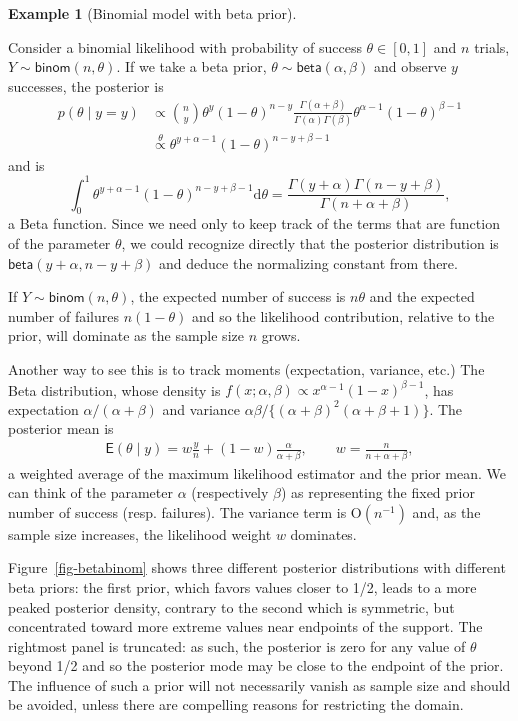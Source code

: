 \documentclass[
  11pt,
  letterpaper,
]{scrbook}
\theoremstyle{definition}
\theoremstyle{plain}
\theoremstyle{plain}
\theoremstyle{definition}
\newtheorem{example}{Example}[chapter]
\theoremstyle{definition}
\theoremstyle{remark}
\begin{document}
\begin{example}[Binomial model with beta
prior]\protect\hypertarget{exm-betabinomconjugate}{}\label{exm-betabinomconjugate}

Consider a binomial likelihood with probability of success
\(\theta \in [0,1]\) and \(n\) trials,
\(Y \sim \mathsf{binom}(n, \theta)\). If we take a beta prior,
\(\theta \sim \mathsf{beta}(\alpha, \beta)\) and observe \(y\)
successes, the posterior is \begin{align*}
p(\theta \mid y = y) &\propto \binom{n}{y} \theta^y (1-\theta)^{n-y} \frac{\Gamma(\alpha + \beta)}{\Gamma(\alpha) \Gamma(\beta)}\theta^{\alpha-1} (1-\theta)^{\beta-1}
\\&\stackrel{\theta}{\propto} \theta^{y+\alpha-1}(1-\theta)^{n-y+\beta-1}
\end{align*} and is
\[\int_{0}^{1} \theta^{y+\alpha-1}(1-\theta)^{n-y+\beta-1}\mathrm{d} \theta = \frac{\Gamma(y+\alpha)\Gamma(n-y+\beta)}{\Gamma(n+\alpha+\beta)},\]
a Beta function. Since we need only to keep track of the terms that are
function of the parameter \(\theta\), we could recognize directly that
the posterior distribution is \(\mathsf{beta}(y+\alpha, n-y+\beta)\) and
deduce the normalizing constant from there.

If \(Y \sim \mathsf{binom}(n, \theta)\), the expected number of success
is \(n\theta\) and the expected number of failures \(n(1-\theta)\) and
so the likelihood contribution, relative to the prior, will dominate as
the sample size \(n\) grows.

Another way to see this is to track moments (expectation, variance,
etc.) The Beta distribution, whose density is
\(f(x; \alpha, \beta) \propto x^{\alpha-1} (1-x)^{\beta-1}\), has
expectation \(\alpha/(\alpha+\beta)\) and variance
\(\alpha\beta/\{(\alpha+\beta)^2(\alpha+\beta+1)\}\). The posterior mean
is \begin{align*}
 \mathsf{E}(\theta \mid y) = w\frac{y}{n} + (1-w) \frac{\alpha}{\alpha+\beta}, 
 \qquad w = \frac{n}{n+\alpha + \beta},
 \end{align*} a weighted average of the maximum likelihood estimator and
the prior mean. We can think of the parameter \(\alpha\) (respectively
\(\beta\)) as representing the fixed prior number of success (resp.
failures). The variance term is \(\mathrm{O}(n^{-1})\) and, as the
sample size increases, the likelihood weight \(w\) dominates.

Figure~\ref{fig-betabinom} shows three different posterior distributions
with different beta priors: the first prior, which favors values closer
to 1/2, leads to a more peaked posterior density, contrary to the second
which is symmetric, but concentrated toward more extreme values near
endpoints of the support. The rightmost panel is truncated: as such, the
posterior is zero for any value of \(\theta\) beyond 1/2 and so the
posterior mode may be close to the endpoint of the prior. The influence
of such a prior will not necessarily vanish as sample size and should be
avoided, unless there are compelling reasons for restricting the domain.


\end{example}
\end{document}
